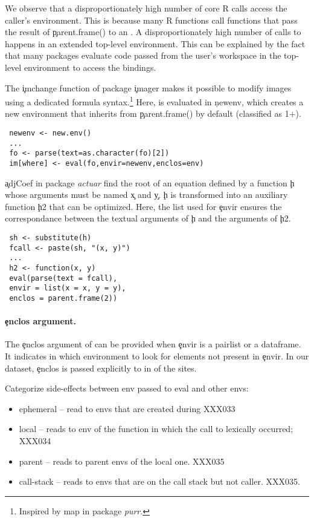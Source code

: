 \documentclass[screen,acmsmall]{acmart}
\begin{document}
We observe that a disproportionately high number of core R \eval calls access
the caller's environment. This is because many R functions call functions that
pass the result of \c{parent.frame()} to an \eval. A disproportionately high
number of calls to \eval happens in an extended top-level environment. This can
be explained by the fact that many packages evaluate code passed from the user's
workspace in the top-level environment to access the bindings.

The \c{imchange} function of package \c{imager} makes it possible to modify
images using a dedicated formula syntax.\footnote{Inspired by {map} in package
\emph{purr}.} Here, \eval is evaluated in \c{newenv}, which creates a new
environment that inherits from \c{parent.frame()} by default (classified as 1+).

\begin{lstlisting}
 newenv <- new.env()
 ...
 fo <- parse(text=as.character(fo)[2])
 im[where] <- eval(fo,envir=newenv,enclos=env)
\end{lstlisting}

\c{adjCoef} in package \emph{actuar} find the root of an equation defined by a
function \c{h} whose arguments must be named \c{x} and \c{y}. \c{h} is
transformed into an auxiliary function \c{h2} that can be optimized. Here, the
list used for \c{envir} ensures the correspondance between the textual arguments
of \c{h} and the arguments of \c{h2}.

\begin{lstlisting}
 sh <- substitute(h)
 fcall <- paste(sh, "(x, y)")
 ...
 h2 <- function(x, y)
 eval(parse(text = fcall),
 envir = list(x = x, y = y),
 enclos = parent.frame(2))
\end{lstlisting}


\paragraph{\c{enclos} argument.} The \c{enclos} argument of \eval can be provided when \c{envir} is a pairlist or a dataframe. It indicates in which environment to look for elements not present in \c{envir}. In our dataset, \c{enclos} is passed explicitly to \eval in \packageEnclosSitePercent of the sites.


Categorize side-effects between env passed to eval and other envs:
\begin{itemize}
\item ephemeral -- read to envs that are created during \eval  XXX033
\item local -- reads to env of the function in which the call to \eval
  lexically occurred; XXX034
\item parent -- reads to parent envs of the local one. XXX035
\item call-stack -- reads to envs that are on the call stack but not
  caller. XXX035.
\end{itemize}
\end{document}
